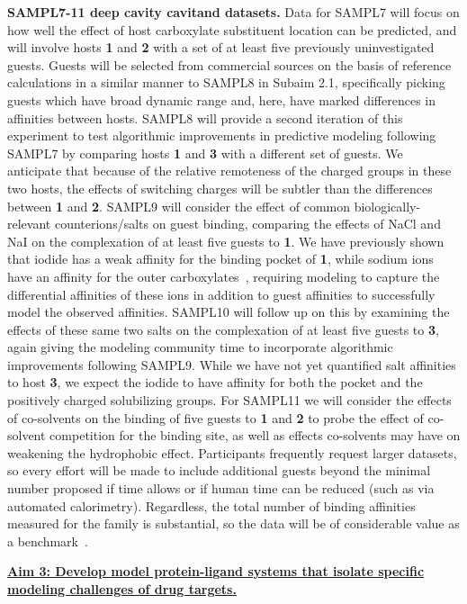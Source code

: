 \documentclass[11pt]{article}
\begin{document}
{\bf SAMPL7-11 deep cavity cavitand datasets.} 
Data for SAMPL7 will focus on how well the effect of host carboxylate substituent location can be predicted, and will involve hosts {\bf 1} and {\bf 2} with a set of at least five previously uninvestigated guests.  
Guests will be selected from commercial sources on the basis of reference calculations in a similar manner to SAMPL8 in Subaim 2.1, specifically picking guests which have broad dynamic range and, here, have marked differences in affinities between hosts.
SAMPL8 will provide a second iteration of this experiment to test algorithmic improvements in predictive modeling following SAMPL7 by comparing hosts {\bf 1} and {\bf 3} with a different set of guests.  
We anticipate that because of the relative remoteness of the charged groups in these two hosts, the effects of switching charges will be subtler than the differences between {\bf 1} and {\bf 2}.  
SAMPL9 will consider the effect of common biologically-relevant counterions/salts on guest binding, comparing the effects of NaCl and NaI on the complexation of at least five guests to {\bf 1}.  
We have previously shown that iodide has a weak affinity for the binding pocket of {\bf 1}, while sodium ions have an affinity for the outer carboxylates~\cite{carnegie_anion_2014}, requiring modeling to capture the differential affinities of these ions in addition to guest affinities to successfully model the observed affinities.  
SAMPL10 will follow up on this by examining the effects of these same two salts on the complexation of at least five guests to {\bf 3}, again giving the modeling community time to incorporate algorithmic improvements following SAMPL9. 
While we have not yet quantified salt affinities to host {\bf 3}, we expect the iodide to have affinity for both the pocket and the positively charged solubilizing groups.  
For SAMPL11 we will consider the effects of co-solvents on the binding of five guests to {\bf 1} and {\bf 2} to probe the effect of co-solvent competition for the binding site, as well as effects co-solvents may have on weakening the hydrophobic effect. 
Participants frequently request larger datasets, so every effort will be made to include additional guests beyond the minimal number proposed if time allows or if human time can be reduced (such as via automated calorimetry).
Regardless, the total number of binding affinities measured for the family is substantial, so the data will be of considerable value as a benchmark~\cite{Mobley:2017:AnnualReviewofBiophysics}. 


\textbf{\underline{Aim 3: Develop model protein-ligand systems that isolate specific modeling challenges of drug targets.}}
\end{document}
